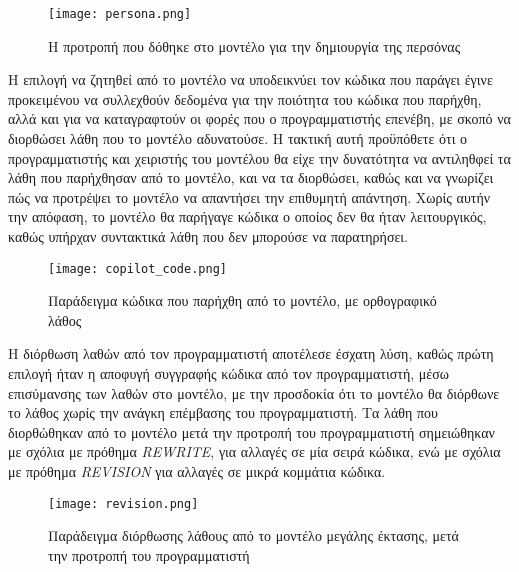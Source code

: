 \begin{figure}[H]
  \begin{center}
    \texttt{[image: persona.png]}
    \label{fig:persona}
    \caption{Η προτροπή που δόθηκε στο μοντέλο για την δημιουργία της
      περσόνας}
  \end{center}
\end{figure}

Η επιλογή να ζητηθεί από το μοντέλο να υποδεικνύει τον κώδικα που
παράγει έγινε προκειμένου να συλλεχθούν δεδομένα για την ποιότητα του
κώδικα που παρήχθη, αλλά και για να καταγραφτούν οι φορές που ο
προγραμματιστής επενέβη, με σκοπό να διορθώσει λάθη που το μοντέλο
αδυνατούσε. Η τακτική αυτή προϋπόθετε ότι ο προγραμματιστής και
χειριστής του μοντέλου θα είχε την δυνατότητα να αντιληθφεί τα λάθη που
παρήχθησαν από το μοντέλο, και να τα διορθώσει, καθώς και να γνωρίζει
πώς να προτρέψει το μοντέλο να απαντήσει την επιθυμητή απάντηση. Χωρίς
αυτήν την απόφαση, το μοντέλο θα παρήγαγε κώδικα ο οποίος δεν θα ήταν
λειτουργικός, καθώς υπήρχαν συντακτικά λάθη που δεν μπορούσε να
παρατηρήσει.

\begin{figure}[H]
  \begin{center}
    \texttt{[image: copilot\_code.png]}
    \label{fig:copilotCode}
    \caption{Παράδειγμα κώδικα που παρήχθη από το μοντέλο, με
      ορθογραφικό λάθος}
  \end{center}
\end{figure}

Η διόρθωση λαθών από τον προγραμματιστή αποτέλεσε έσχατη λύση, καθώς
πρώτη επιλογή ήταν η αποφυγή συγγραφής κώδικα από τον προγραμματιστή,
μέσω επισύμανσης των λαθών στο μοντέλο, με την προσδοκία ότι το μοντέλο
θα διόρθωνε το λάθος χωρίς την ανάγκη επέμβασης του προγραμματιστή. Τα
λάθη που διορθώθηκαν από το μοντέλο μετά την προτροπή του προγραμματιστή
σημειώθηκαν με σχόλια με πρόθημα \textlatin{\textit{REWRITE}}, για
αλλαγές σε μία σειρά κώδικα, ενώ με σχόλια με πρόθημα
\textlatin{\textit{REVISION}} για αλλαγές σε μικρά κομμάτια κώδικα.

\begin{figure}[H]
  \begin{center}
    \texttt{[image: revision.png]}
    \label{fig:revision}
    \caption{Παράδειγμα διόρθωσης λάθους από το μοντέλο μεγάλης έκτασης,
      μετά την προτροπή του προγραμματιστή}
  \end{center}
\end{figure}

